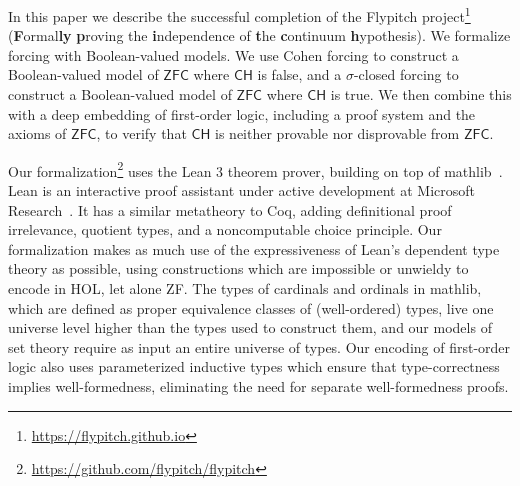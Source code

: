 \documentclass[sigplan,screen]{acmart}
\newcommand{\ZFC}{\mathsf{ZFC}}
\newcommand{\CH}{\mathsf{CH}}
\theoremstyle{definition}
\begin{document}
In this paper we describe the successful completion of the Flypitch project\footnote{\url{https://flypitch.github.io}} (\textbf{F}ormal\textbf{ly} \textbf{p}roving the \textbf{i}ndependence of \textbf{t}he \textbf{c}ontinuum \textbf{h}ypothesis).
We formalize forcing with Boolean-valued models. We use Cohen forcing to construct a Boolean-valued model of \(\ZFC\) where \(\CH\) is false, and a \(\sigma\)-closed forcing to construct a Boolean-valued model of \(\ZFC\) where \(\CH\) is true. We then combine this with a deep embedding of first-order logic, including a proof system and the axioms of \(\ZFC\), to verify that \(\CH\) is neither provable nor disprovable from \(\ZFC\).

Our formalization\footnote{\url{https://github.com/flypitch/flypitch}} uses the Lean 3 theorem prover, building on top of \textsf{mathlib}~\cite{mathlib}.
Lean is an interactive proof assistant under active development at Microsoft Research~\cite{de2015lean, ullrich2019counting}. It has a similar metatheory to Coq, adding definitional proof irrelevance, quotient types, and a noncomputable choice principle.
Our formalization makes as much use of the expressiveness of Lean's dependent type theory as possible, using constructions which are impossible or unwieldy to encode in HOL, let alone ZF.
The types of cardinals and ordinals in \textsf{mathlib}, which are defined as proper equivalence classes of (well-ordered) types, live one universe level higher than the types used to construct them, and our models of set theory require as input an entire universe of types. Our encoding of first-order logic also uses parameterized inductive types which ensure that type-correctness implies well-formedness, eliminating the need for separate well-formedness proofs.

\end{document}
